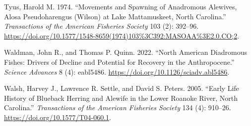 \documentclass[
]{book}
\newlength{\cslhangindent}
\newlength{\cslentryspacingunit} %
\newenvironment{CSLReferences}[2] %
 {%
  \setlength{\parindent}{0pt}
  \ifodd #1
  \let\oldpar\par
  \def\par{\hangindent=\cslhangindent\oldpar}
  \fi
  \setlength{\parskip}{#2\cslentryspacingunit}
 }%
 {}
\begin{document}
\begin{CSLReferences}{1}{0}
\leavevmode{}%
Tyus, Harold M. 1974. {``Movements and {Spawning} of {Anadromous} {Alewives}, {Alosa} Pseudoharengus ({Wilson}) at {Lake} {Mattamuskeet}, {North} {Carolina}.''} \emph{Transactions of the American Fisheries Society} 103 (2): 392--96. \url{https://doi.org/10.1577/1548-8659(1974)103\%3C392:MASOAA\%3E2.0.CO;2}.

\leavevmode{}%
Waldman, John R., and Thomas P. Quinn. 2022. {``North {American} Diadromous Fishes: {Drivers} of Decline and Potential for Recovery in the {Anthropocene}.''} \emph{Science Advances} 8 (4): eabl5486. \url{https://doi.org/10.1126/sciadv.abl5486}.

\leavevmode{}%
Walsh, Harvey J., Lawrence R. Settle, and David S. Peters. 2005. {``Early {Life} {History} of {Blueback} {Herring} and {Alewife} in the {Lower} {Roanoke} {River}, {North} {Carolina}.''} \emph{Transactions of the American Fisheries Society} 134 (4): 910--26. \url{https://doi.org/10.1577/T04-060.1}.

\end{CSLReferences}
\end{document}
